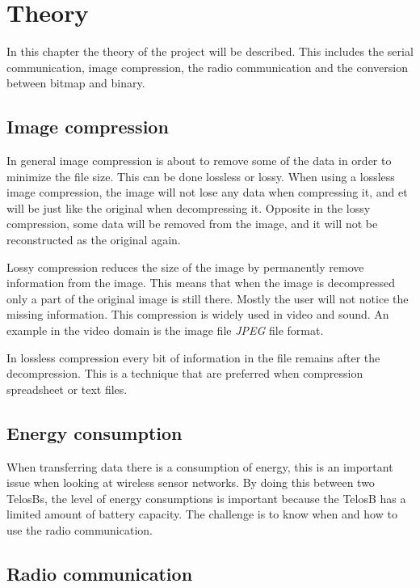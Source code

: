 \chapter{Theory}
\label{chp:theory}

In this chapter the theory of the project will be described. This includes the serial communication, image compression, the radio communication and the conversion between bitmap and binary.

\section{Image compression}
In general image compression is about to remove some of the data in order to minimize the file size. This can be done lossless or lossy. When using a lossless image compression, the image will not lose any data when compressing it, and et will be just like the original when decompressing it. Opposite in the lossy compression, some data will be removed from the image, and it will not be reconstructed as the original again.

Lossy compression reduces the size of the image by permanently remove information from the image. This means that when the image is decompressed only a part of the original image is still there. Mostly the user will not notice the missing information. This compression is widely used in video and sound. An example in the video domain is the image file \emph{JPEG} file format.

In lossless compression every bit of information in the file remains after the decompression. This is a technique that are preferred when compression spreadsheet or text files.  

\section{Energy consumption}
When transferring data there is a consumption of energy, this is an important issue when looking at wireless sensor networks. By doing this between two TelosBs, the level of energy consumptions is important because the TelosB has a limited amount of battery capacity. The challenge is to know when and how to use the radio communication.

\section{Radio communication}